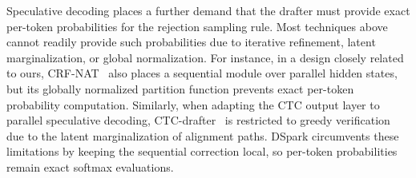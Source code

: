 Speculative decoding places a further demand that the drafter must provide exact per-token probabilities for the rejection sampling rule. 
Most techniques above cannot readily provide such probabilities due to iterative refinement, latent marginalization, or global normalization.
For instance, in a design closely related to ours, CRF-NAT~\citep{NEURIPS2019_74563ba2} also places a sequential module over parallel hidden states, but its globally normalized partition function prevents exact per-token probability computation. Similarly, when adapting the CTC output layer to parallel speculative decoding, CTC-drafter~\citep{NEURIPS2024_a79054a9} is restricted to greedy verification due to the latent marginalization of alignment paths. DSpark circumvents these limitations by keeping the sequential correction local, so per-token probabilities remain exact softmax evaluations. 



